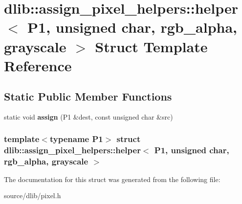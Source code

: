 \hypertarget{structdlib_1_1assign__pixel__helpers_1_1helper_3_01P1_00_01unsigned_01char_00_01rgb__alpha_00_01grayscale_01_4}{
\section{dlib::assign\_\-pixel\_\-helpers::helper$<$ P1, unsigned char, rgb\_\-alpha, grayscale $>$ Struct Template Reference}
\label{structdlib_1_1assign__pixel__helpers_1_1helper_3_01P1_00_01unsigned_01char_00_01rgb__alpha_00_01grayscale_01_4}
}
\subsection*{Static Public Member Functions}
\begin{DoxyCompactItemize}
\item 
\hypertarget{structdlib_1_1assign__pixel__helpers_1_1helper_3_01P1_00_01unsigned_01char_00_01rgb__alpha_00_01grayscale_01_4_a5282b7adad404e5c0f0deaebde5cd4b9}{
static void {\bfseries assign} (P1 \&dest, const unsigned char \&src)}
\label{structdlib_1_1assign__pixel__helpers_1_1helper_3_01P1_00_01unsigned_01char_00_01rgb__alpha_00_01grayscale_01_4_a5282b7adad404e5c0f0deaebde5cd4b9}

\end{DoxyCompactItemize}
\subsubsection*{template$<$typename P1$>$ struct dlib::assign\_\-pixel\_\-helpers::helper$<$ P1, unsigned char, rgb\_\-alpha, grayscale $>$}



The documentation for this struct was generated from the following file:\begin{DoxyCompactItemize}
\item 
source/dlib/pixel.h\end{DoxyCompactItemize}
